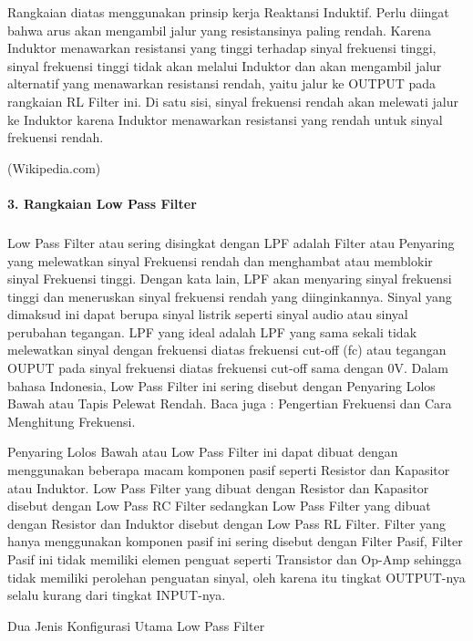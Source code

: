 \documentclass[12pt,a4paper]{article}
\begin{document}
Rangkaian diatas menggunakan prinsip kerja Reaktansi Induktif. Perlu diingat bahwa arus akan mengambil jalur yang resistansinya paling rendah. Karena Induktor menawarkan resistansi yang tinggi terhadap sinyal frekuensi tinggi, sinyal frekuensi tinggi tidak akan melalui Induktor dan akan mengambil jalur alternatif yang menawarkan resistansi rendah, yaitu jalur ke OUTPUT pada rangkaian RL Filter ini. Di satu sisi, sinyal frekuensi rendah akan melewati jalur ke Induktor karena Induktor menawarkan resistansi yang rendah untuk sinyal frekuensi rendah.

\begin{flushright}
(Wikipedia.com) 
\end{flushright}

\paragraph{ }
\textbf{3. Rangkaian Low Pass Filter}
\subparagraph{ }
	Low Pass Filter atau sering disingkat dengan LPF adalah Filter atau Penyaring yang melewatkan sinyal Frekuensi rendah dan menghambat atau memblokir sinyal Frekuensi tinggi. Dengan kata lain, LPF akan menyaring sinyal frekuensi tinggi dan meneruskan sinyal frekuensi rendah yang diinginkannya. Sinyal yang dimaksud ini dapat berupa sinyal listrik seperti sinyal audio atau sinyal perubahan tegangan. LPF yang ideal adalah LPF yang sama sekali tidak melewatkan sinyal dengan frekuensi diatas frekuensi cut-off (fc) atau tegangan OUPUT pada sinyal frekuensi diatas frekuensi cut-off sama dengan 0V. Dalam bahasa Indonesia, Low Pass Filter ini sering disebut dengan Penyaring Lolos Bawah atau Tapis Pelewat Rendah.
Baca juga : Pengertian Frekuensi dan Cara Menghitung Frekuensi.


 
Penyaring Lolos Bawah atau Low Pass Filter ini dapat dibuat dengan menggunakan beberapa macam komponen pasif seperti Resistor dan Kapasitor atau Induktor. Low Pass Filter yang dibuat dengan Resistor dan Kapasitor disebut dengan Low Pass RC Filter sedangkan Low Pass Filter yang dibuat dengan Resistor dan Induktor disebut dengan Low Pass RL Filter. Filter yang hanya menggunakan komponen pasif ini sering disebut dengan Filter Pasif, Filter Pasif ini tidak memiliki elemen penguat seperti Transistor dan Op-Amp sehingga tidak memiliki perolehan penguatan sinyal, oleh karena itu tingkat OUTPUT-nya selalu kurang dari tingkat INPUT-nya.

Dua Jenis Konfigurasi Utama Low Pass Filter
\end{document}
